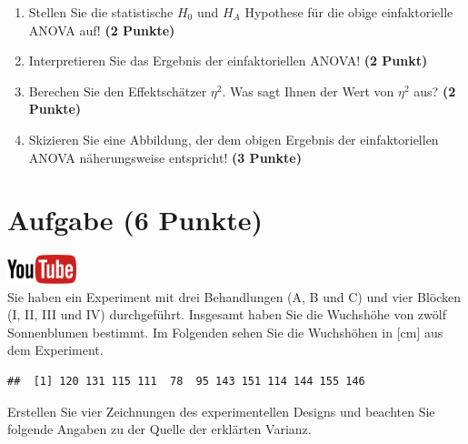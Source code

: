 \documentclass[a4paper, 10pt]{scrartcl}\usepackage[]{graphicx}\usepackage[]{xcolor}
\makeatletter
\newenvironment{kframe}{%
 \def\at@end@of@kframe{}%
 \ifinner\ifhmode%
  \def\at@end@of@kframe{\end{minipage}}%
  \begin{minipage}{\columnwidth}%
 \fi\fi%
 \def\FrameCommand##1{\hskip\@totalleftmargin \hskip-\fboxsep
 \colorbox{shadecolor}{##1}\hskip-\fboxsep
     \hskip-\linewidth \hskip-\@totalleftmargin \hskip\columnwidth}%
 \MakeFramed {\advance\hsize-\width
   \@totalleftmargin\z@ \linewidth\hsize
   \@setminipage}}%
 {\par\unskip\endMakeFramed%
 \at@end@of@kframe}
\newenvironment{knitrout}{}{} %
\makeatother
\begin{document}
\begin{enumerate}
\item Stellen Sie die statistische $H_0$ und $H_A$ Hypothese f{\"u}r die obige
  einfaktorielle ANOVA auf! \textbf{(2 Punkte)}
\item Interpretieren Sie das Ergebnis der einfaktoriellen ANOVA! \textbf{(2 Punkt)} 
\item Berechen Sie den Effektsch{\"a}tzer $\eta^2$. Was sagt Ihnen der Wert von
  $\eta^2$ aus? \textbf{(2 Punkte)}
\item Skizieren Sie eine Abbildung, der dem obigen Ergebnis der
  einfaktoriellen ANOVA n{\"a}herungsweise entspricht! \textbf{(3 Punkte)}
\end{enumerate}

 
\clearpage

\section{Aufgabe \hfill (6 Punkte)}

\hfill\href{https://youtu.be/zDK2dhgtFt0}{\includegraphics[width =
  2cm]{img/youtube}}\\[1Ex]


Sie haben ein Experiment mit drei Behandlungen (A, B und C) und vier
Bl{\"o}cken (I, II, III und IV) durchgef{\"u}hrt. Insgesamt haben Sie die Wuchsh{\"o}he
von zw{\"o}lf Sonnenblumen bestimmt. Im Folgenden sehen Sie die Wuchsh{\"o}hen in
[cm] aus dem Experiment.


\begin{knitrout}
\color{fgcolor}\begin{kframe}
\begin{verbatim}
##  [1] 120 131 115 111  78  95 143 151 114 144 155 146
\end{verbatim}
\end{kframe}
\end{knitrout}

Erstellen Sie vier Zeichnungen des experimentellen Designs und beachten
Sie folgende Angaben zu der Quelle der erkl{\"a}rten Varianz. 
\end{document}
